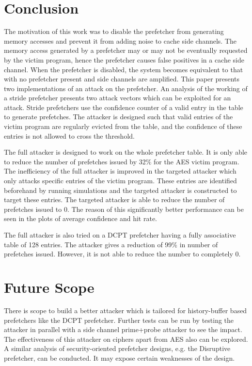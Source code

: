 \documentclass[conference]{IEEEtran}
\begin{document}
\section{Conclusion}

The motivation of this work was to disable the prefetcher from
generating memory accesses and prevent it from adding noise
to cache side channels.
The memory access generated by a prefetcher may or may not be eventually
requested by the victim program, hence the prefetcher causes false
positives in a cache side channel.
When the prefetcher is disabled, the system becomes equivalent to
that with no prefetcher present and side channels are amplified.
This paper presents two implementations of an attack on the prefetcher.
An analysis of the working of a stride prefetcher presents
two attack vectors which can be exploited for an attack.
Stride prefetchers use the confidence counter of a valid entry in the
table to generate prefetches. The attacker is designed such that
valid entries of the victim program are regularly evicted from the table,
and the confidence of these entries is not allowed to cross the threshold.

The full attacker is designed to work on the whole prefetcher table.
It is only able to reduce the number of prefetches issued by 32\% for the
AES victim program. The inefficiency of the full attacker is improved
in the targeted attacker which only attacks specific entries of the victim
program. These entries are identified beforehand by running simulations
and the targeted attacker is constructed to target these entries.
The targeted attacker is able to reduce the number of prefetches issued to
0. The reason of this significantly better performance can be seen
in the plots of average confidence and hit rate.

The full attacker is also tried on a DCPT prefetcher having a fully associative
table of 128 entries. The attacker gives a reduction of 99\% in number of prefetches
issued. However, it is not able to reduce the number to completely 0.

\section{Future Scope}

There is scope to build a better attacker which is tailored for history-buffer
based prefetchers like the DCPT prefetcher.
Further tests can be run by testing the attacker in parallel with a side
channel prime+probe attacker to see the impact. The effectiveness of this
attacker on ciphers apart from AES also can be explored.
A similar analysis of security-oriented prefetcher designs, e.g. the Disruptive prefetcher,
can be conducted. It may expose certain weaknesses of the design.







\end{document}
